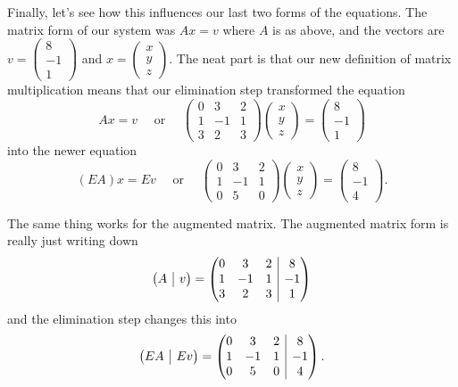 \documentclass[10pt,]{book}
\makeatletter
\theoremstyle{plain}
\numberwithin{equation}{section}
\newcommand{\augmatrix}[2]{\left(\begin{array}{@{}#1 |c@{}} #2 \end{array}\right)}
\makeatother
\begin{document}
        Finally, let's see how this influences our last two forms of the equations.
        The matrix form of our system was \(Ax = v\) where \(A\) is as above, and the
        vectors are \(v = \left(\begin{smallmatrix} 8 \\ -1 \\ 1
        \end{smallmatrix}\right)\) and
        \(x = \left( \begin{smallmatrix} x \\ y \\ z \end{smallmatrix}\right)\).
        The neat part is that our new definition of matrix multiplication means
        that our elimination step transformed the equation
        \[
          Ax = v \quad \text{ or }\quad
          \begin{pmatrix} 0 &3 &2 \\ 1 &-1 &1 \\ 3 &2 &3
          \end{pmatrix} \begin{pmatrix} x \\ y \\ z \end{pmatrix} =
          \begin{pmatrix} 8 \\ -1 \\ 1 \end{pmatrix}
        \]
        into the newer equation
        \[
          (EA) x = Ev \quad \text{ or } \quad \begin{pmatrix} 0 &3 &2
          \\ 1 &-1 &1 \\ 0 &5 &0 \end{pmatrix} \begin{pmatrix} x
          \\ y \\ z \end{pmatrix} = \begin{pmatrix} 8 \\ -1 \\ 4 \end{pmatrix}.
        \]
\par

        The same thing works for the augmented matrix. The augmented matrix form
        is really just writing down
        \[
          \augmatrix{c}{A &v }
          =\augmatrix{ccc}{
          0 &3 &2 &8\\ 1 &-1 &1 &-1\\ 3 &2 &3 &1 }
        \]
        and the elimination step changes this into
        \[
          \augmatrix{c}{EA &Ev}
          = \augmatrix{ccc}{
          0 &3 &2 &8 \\ 1 &-1 &1 &-1 \\ 0 &5 &0 &4
          }.
        \]
\typeout{************************************************}
\typeout{************************************************}
\end{document}
